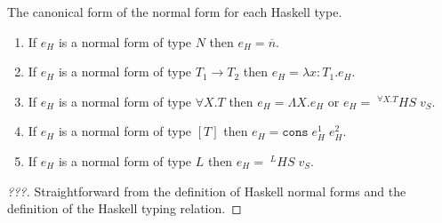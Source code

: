 \begin{hcf}
\label{hcf}
The canonical form of the normal form for each Haskell type.
\begin{enumerate}
\item If $e_{H}$ is a normal form of type $N$ then $e_{H}=\overline{n}$.
\item If $e_{H}$ is a normal form of type $T_{1}\rightarrow T_{2}$ then $e_{H}=\lambda x:T_{1}.e_{H}$.
\item If $e_{H}$ is a normal form of type $\forall X.T$ then $e_{H}=\Lambda X.e_{H}$ or $e_{H}=\;^{\forall X.T}HS\;v_{S}$.
\item If $e_{H}$ is a normal form of type $[T]$ then $e_{H}=\mathtt{cons}\;e_{H}^{1}\;e_{H}^{2}$.
\item If $e_{H}$ is a normal form of type $L$ then $e_{H}=\;^{L}HS\;v_{S}$.
\end{enumerate}
\begin{proof}
[???] Straightforward from the definition of Haskell normal forms and the definition of the Haskell typing relation.
\end{proof}
\end{hcf}